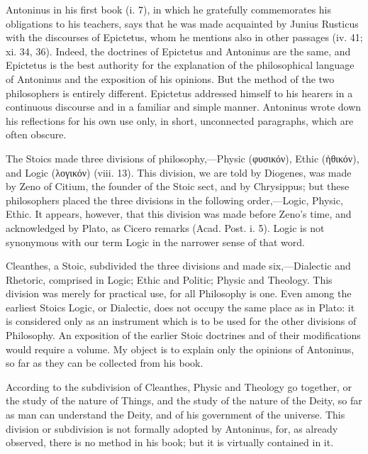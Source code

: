 Antoninus in his first book (i. 7), in which he gratefully commemorates his obligations to his teachers, says that he was made acquainted by Junius Rusticus with the discourses of Epictetus, whom he mentions also in other passages (iv. 41; xi. 34, 36). Indeed, the doctrines of Epictetus and Antoninus are the same, and Epictetus is the best authority for the explanation of the philosophical language of Antoninus and the exposition of his opinions. But the method of the two philosophers is entirely different. Epictetus addressed himself to his hearers in a continuous discourse and in a familiar and simple manner. Antoninus wrote down his reflections for his own use only, in short, unconnected paragraphs, which are often obscure.

The Stoics made three divisions of philosophy,—Physic (\textgreek{φυσικόν}), Ethic (\textgreek{ἠθικόν}), and Logic (\textgreek{λογικόν}) (viii. 13). This division, we are told by Diogenes, was made by Zeno of Citium, the founder of the Stoic sect, and by Chrysippus; but these philosophers placed the three divisions in the following order,—Logic, Physic, Ethic. It appears, however, that this division was made before Zeno's time, and acknowledged by Plato, as Cicero remarks (Acad. Post. i. 5). Logic is not synonymous with our term Logic in the narrower sense of that word.

Cleanthes, a Stoic, subdivided the three divisions and made six,—Dialectic and Rhetoric, comprised in Logic; Ethic and Politic; Physic and Theology. This division was merely for practical use, for all Philosophy is one. Even among the earliest Stoics Logic, or Dialectic, does not occupy the same place as in Plato: it is considered only as an instrument which is to be used for the other divisions of Philosophy. An exposition of the earlier Stoic doctrines and of their modifications would require a volume. My object is to explain only the opinions of Antoninus, so far as they can be collected from his book.

According to the subdivision of Cleanthes, Physic and Theology go together, or the study of the nature of Things, and the study of the nature of the Deity, so far as man can understand the Deity, and of his government of the universe. This division or subdivision is not formally adopted by Antoninus, for, as already observed, there is no method in his book; but it is virtually contained in it.

